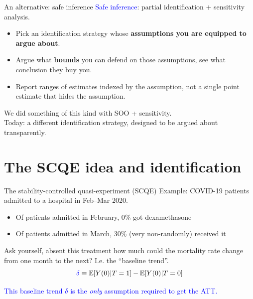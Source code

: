 \documentclass[handout,xcolor=dvipsnames,pdftex,hyperref={colorlinks=false}]{beamer}
\newcommand\makegaps{\addtolength{\itemsep}{.25\baselineskip}}
\newcommand\E{\mathbb{E}}
\begin{document}
\begin{frame}{An alternative: safe inference}
 \textcolor{blue}{Safe inference}: partial identification $+$ sensitivity analysis.\\
\bigskip
\small
\begin{itemize}\makegaps
  \item<2-> Pick an identification strategy whose \textbf{assumptions you are equipped to argue about}.
  \item<3-> Argue what \textbf{bounds} you can defend on those assumptions, see what conclusion they buy you.
  \item<4-> Report ranges of estimates indexed by the assumption, not a single point estimate that hides the assumption.
\end{itemize}
\bigskip
{} We did something of this kind with SOO + sensitivity. \\
\medskip
{} Today: a different identification strategy, designed to be argued about transparently.
\end{frame}

\section{The SCQE idea and identification}

\begin{frame}{The stability-controlled quasi-experiment (SCQE)}
\medskip
{} Example: COVID-19 patients admitted to a hospital in Feb--Mar 2020.\\
\small
\begin{itemize}
    \item Of patients admitted in February, 0\% got dexamethasone
    \item Of patients admitted in March, 30\% (very non-randomly) received it
\end{itemize}
\bigskip
\normalsize
{} Ask yourself, absent this treatment how much could the mortality rate change from one month to the next?  I.e. the ``baseline trend''. \\

\[\textcolor{blue}{\delta} \equiv \E[Y(0)|T=1] - \E[Y(0)|T=0]  \]

\bigskip
{}  \textcolor{blue}{This baseline trend $\delta$ is the \emph{only} assumption required to get the ATT.}

\end{frame}
\end{document}
